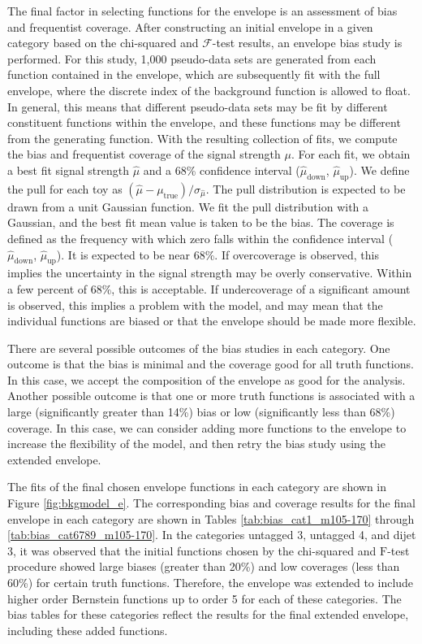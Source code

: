 The final factor in selecting functions for the envelope is an assessment of bias and frequentist coverage. 
After constructing an initial envelope in a given 
category based on the chi-squared and $\mathcal{F}$-test results, an envelope bias study is performed. 
For this study, 1,000 pseudo-data sets are generated from each function contained in the envelope, which are subsequently fit with the full envelope, where 
the discrete index of the background function is allowed to float. 
In general, this means that different pseudo-data sets may be fit by different 
constituent functions within the envelope, and these functions may be different from the generating function. 
With the resulting collection of fits, we compute the bias and frequentist coverage of the signal strength $\mu$. 
For each fit, we obtain a best fit signal strength $\hat{\mu}$ and a 68\% confidence interval
($\hat{\mu}_{\mathrm{down}}$, $\hat{\mu}_{\mathrm{up}}$). We define the pull for each toy as 
$(\hat{\mu}-\mu_{\mathrm{true}})/\sigma_{\hat{\mu}}$. 
The pull distribution is expected to be drawn from a unit Gaussian function. 
We fit the pull distribution with a Gaussian, and the best fit mean 
value is taken to be the bias. The coverage is defined as the frequency with which zero falls
within the confidence interval ($\hat{\mu}_{\mathrm{down}}$, $\hat{\mu}_{\mathrm{up}}$). It is expected to be 
near 68\%. If overcoverage is observed, this implies the uncertainty in the signal strength may 
be overly conservative. Within a few percent of 68\%, this is acceptable. If undercoverage of 
a significant amount is observed, this implies a problem with the model, and may mean that 
the individual functions are biased or that the envelope should be made more flexible. 

There are several possible outcomes of the bias studies in each 
category. One outcome is that the bias is minimal and the coverage good for all 
truth functions. In this case, we accept the composition of the envelope as good 
for the analysis. Another possible outcome is that one or more truth functions is 
associated with a large (significantly greater than 14\%) bias or low 
(significantly less than 68\%) coverage. In this case, we can consider adding 
more functions to the envelope to increase the flexibility of the model, and then 
retry the bias study using the extended envelope. 

The fits of the final chosen envelope functions in each category are shown in Figure \ref{fig:bkgmodel_e}.
The corresponding bias and coverage results for the final envelope in each category 
are shown in Tables \ref{tab:bias_cat1_m105-170} through \ref{tab:bias_cat6789_m105-170}. 
In the categories untagged 3, untagged 4, and dijet 3, it was observed that the initial functions chosen 
by the chi-squared and $\mathrm{F}$-test procedure showed large biases (greater than 20\%) and low coverages (less than 60\%) for 
certain truth functions. Therefore, the envelope was extended to include higher order Bernstein functions up 
to order 5 for each of these categories. The bias tables for these categories reflect the results for the final 
extended envelope, including these added functions. 

